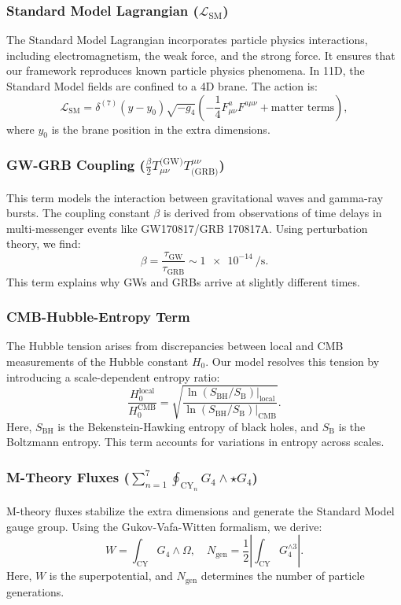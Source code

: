 \documentclass[12pt, a4paper]{article}
\begin{document}
\subsubsection{Standard Model Lagrangian ($\mathcal{L}_{\text{SM}}$)}
The Standard Model Lagrangian incorporates particle physics interactions, including electromagnetism, the weak force, and the strong force. It ensures that our framework reproduces known particle physics phenomena. In 11D, the Standard Model fields are confined to a 4D brane. The action is:
\[
\mathcal{L}_{\text{SM}} = \delta^{(7)}(y - y_0) \sqrt{-g_4} \left( -\frac{1}{4} F_{\mu\nu}^a F^{a\mu\nu} + \text{matter terms} \right),
\]
where \(y_0\) is the brane position in the extra dimensions.

\subsubsection{GW-GRB Coupling ($\frac{\beta}{2} T_{\mu\nu}^{\text{(GW)}} T^{\mu\nu}_{\text{(GRB)}}$)}
This term models the interaction between gravitational waves and gamma-ray bursts. The coupling constant \(\beta\) is derived from observations of time delays in multi-messenger events like GW170817/GRB 170817A. Using perturbation theory, we find:
\[
\beta = \frac{\tau_{\text{GW}}}{\tau_{\text{GRB}}} \sim \SI{1e-14}{\per\second}.
\]
This term explains why GWs and GRBs arrive at slightly different times.

\subsubsection{CMB-Hubble-Entropy Term}
The Hubble tension arises from discrepancies between local and CMB measurements of the Hubble constant \(H_0\). Our model resolves this tension by introducing a scale-dependent entropy ratio:
\[
\frac{H_0^{\text{local}}}{H_0^{\text{CMB}}} = \sqrt{\frac{\ln(S_{\text{BH}}/S_{\text{B}})|_{\text{local}}}{\ln(S_{\text{BH}}/S_{\text{B}})|_{\text{CMB}}}}.
\]
Here, \(S_{\text{BH}}\) is the Bekenstein-Hawking entropy of black holes, and \(S_{\text{B}}\) is the Boltzmann entropy. This term accounts for variations in entropy across scales.

\subsubsection{M-Theory Fluxes ($\sum_{n=1}^7 \oint_{\text{CY}_n} G_4 \wedge \star G_4$)}
M-theory fluxes stabilize the extra dimensions and generate the Standard Model gauge group. Using the Gukov-Vafa-Witten formalism, we derive:
\[
W = \int_{\text{CY}} G_4 \wedge \Omega,\quad N_{\text{gen}} = \frac{1}{2} \left| \int_{\text{CY}} G_4^{\wedge 3} \right|.
\]
Here, \(W\) is the superpotential, and \(N_{\text{gen}}\) determines the number of particle generations.
\end{document}
